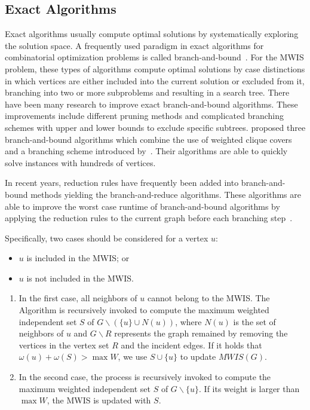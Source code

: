 \documentclass[sigconf, nonacm]{acmart}
\begin{document}
\subsection{Exact Algorithms}

Exact algorithms usually compute optimal solutions by systematically exploring the solution space. A frequently used paradigm in exact algorithms for combinatorial optimization problems is called branch-and-bound~\cite{ostergaard2002fast,warren2006combinatorial}. For the MWIS problem, these types of algorithms compute optimal solutions by case distinctions in which vertices are either included into the current solution or excluded from it, branching into two or more subproblems and resulting in a search tree. There have been many research to improve exact branch-and-bound algorithms. These improvements include different pruning methods and complicated branching schemes with upper and lower bounds to exclude specific subtrees. \citet{warren2006combinatorial} proposed three branch-and-bound algorithms which combine the use of weighted clique covers and a branching scheme introduced by~\citet{balas1986finding}. Their algorithms are able to quickly solve instances with hundreds of vertices.

In recent years, reduction rules have frequently been added into branch-and-bound methods yielding the branch-and-reduce algorithms. These algorithms are able to improve the worst case runtime of branch-and-bound algorithms by applying the reduction rules to the current graph before each branching step~\cite{fomin2009measure}. 

Specifically, two cases should be considered for a vertex $u$: 
\begin{itemize}
	\item $u$ is included in the MWIS; or
	\item $u$ is not included in the MWIS.
\end{itemize}
\begin{enumerate}
	\item In the first case, all neighbors of $u$ cannot belong to the MWIS. The Algorithm is recursively invoked to compute the maximum weighted independent set $S$ of $G\backslash(\{u\} \cup N(u))$, where $N(u)$ is the set of neighbors of $u$ and $G\backslash R$ represents the graph remained by removing the vertices in the vertex set $R$ and the incident edges. If it holds that $\omega(u)+\omega(S)>\max W$, we use $S\cup\{u\}$ to update $MWIS(G)$. 
	\item In the second case, the process is recursively invoked to compute the maximum weighted independent set $S$ of $G\backslash\{u\}$. If its weight is larger than $\max W$, the MWIS is updated with $S$.
\end{enumerate}
\end{document}
